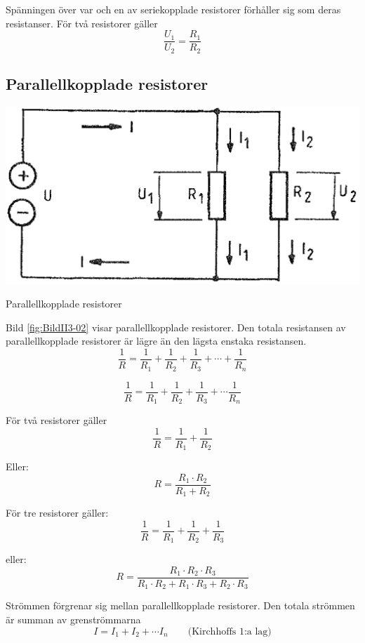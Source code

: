 Spänningen över var och en av seriekopplade resistorer förhåller sig som deras
resistanser. För två resistorer gäller
\[   \dfrac{U_1}{U_2} = \dfrac{R_1}{R_2}   \]

\subsection{Parallellkopplade resistorer}

\begin{marginfigure}%
  \includegraphics[width=\textwidth]{images/cropped_pdfs/bild_2_3-02.pdf}
  \caption{Parallellkopplade resistorer}
  \label{fig:BildII3-02}
\end{marginfigure}

Bild \ref{fig:BildII3-02} visar parallellkopplade resistorer.
Den totala resistansen av parallellkopplade resistorer är lägre än den lägsta
enstaka resistansen.
\[ \frac{1}{R} = \frac{1}{R_1} + \frac{1}{R_2} +
   \frac{1}{R_3} + \cdots + \frac{1}{R_n} \]

\[
\frac{1}{R} = \frac{1}{R_1} + \frac{1}{R_2} + \frac{1}{R_3} + \cdots
\frac{1}{R_n}
\]

För två resistorer gäller
\[ \frac{1}{R} = \frac{1}{R_1} + \frac{1}{R_2} \]

Eller:
\[ R = \frac{R_1 \cdot R_2}{R_1 + R_2} \]

För tre resistorer gäller:
\[ \frac{1}{R} = \frac{1}{R_1} + \frac{1}{R_2} + \frac{1}{R_3} \]

eller:
\[ R = \frac{R_1\cdot R_2\cdot R_3}{R_1\cdot R_2 + R_1\cdot R_3 +
  R_2\cdot R_3} \]

Strömmen förgrenar sig mellan parallellkopplade resistorer. Den totala strömmen
är summan av grenströmmarna
\[ I = I_1 + I_2 + \cdots I_n \qquad \text{(Kirchhoffs 1:a lag)} \]

